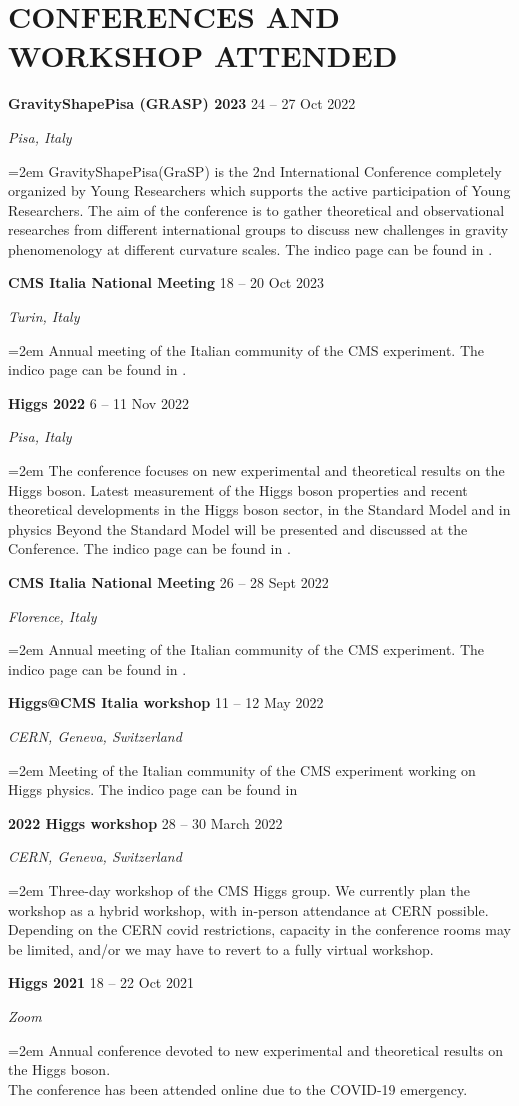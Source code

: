 \documentclass[paper=a4,fontsize=12pt]{article} %
\newcommand{\sepspacesmall}{\vspace*{0.3em}}
\newcommand{\NewPart}[1]{\section*{\uppercase{#1}}}
\newcommand{\EducationEntry}[4]{
	\noindent \textbf{#1} \hfill      %
	{#2} \par  %
	\noindent \textit{#3} \par        %
	\noindent\hangindent=2em\hangafter=0 \small #4 %
	\normalsize \par}
\begin{document}
	\NewPart{Conferences and Workshop attended}
	\EducationEntry{GravityShapePisa (GRASP) 2023}{24 -- 27 Oct 2022}{Pisa, Italy}{GravityShapePisa(GraSP) is the 2nd International Conference completely organized by Young Researchers which supports the active participation of Young Researchers. The aim of the conference is to gather theoretical and observational researches from different international groups to discuss new challenges in gravity phenomenology at different curvature scales. The indico page can be found in \cite{grasp}.} 
	\sepspacesmall
	\EducationEntry{CMS Italia National Meeting}{18 -- 20 Oct 2023}{Turin, Italy}{Annual meeting of the Italian community of the CMS experiment. The indico page can be found in \cite{cmsItalia2023}.} 
	\sepspacesmall
	\EducationEntry{Higgs 2022}{6 -- 11 Nov 2022}{Pisa, Italy}{The conference focuses on new experimental and theoretical results on the Higgs boson. Latest measurement of the Higgs boson properties and recent theoretical developments in the  Higgs boson sector, in the Standard Model and in physics Beyond the Standard Model will be presented and discussed at the Conference. The indico page can be found in \cite{Higgs22}.} 
	\sepspacesmall
	\EducationEntry{CMS Italia National Meeting}{26 -- 28 Sept 2022}{Florence, Italy}{Annual meeting of the Italian community of the CMS experiment. The indico page can be found in \cite{cmsItalia2022}.} 
	\sepspacesmall
	\EducationEntry{Higgs@CMS Italia workshop}{11 -- 12 May 2022}{CERN, Geneva, Switzerland}{Meeting of the Italian community of the CMS experiment working on Higgs physics. The indico page can be found in \cite{HigCMSItalia}}
	\sepspacesmall
	\EducationEntry{2022 Higgs workshop}{28 -- 30 March 2022}{CERN, Geneva, Switzerland}{Three-day workshop of the CMS Higgs group. We currently plan the workshop as a hybrid workshop, with in-person attendance at CERN possible. Depending on the CERN covid restrictions, capacity in the conference rooms may be limited, and/or we may have to revert to a fully virtual workshop. \cite{2022HiggsWorkshop}}
	\EducationEntry{Higgs 2021}{18 -- 22 Oct 2021}{Zoom}{Annual conference devoted to new experimental and theoretical results on the Higgs boson. \\The conference has been attended online due to the COVID-19 emergency. \cite{Higgs_2021}} %
\end{document}
